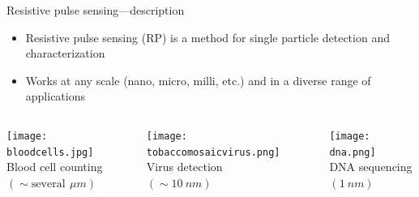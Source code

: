 \begin{frame}[c]{Resistive pulse sensing---description}
	
	
	
			\begin{itemize}
				\item Resistive pulse sensing (RP) is a method for single particle detection and characterization
				\item Works at any scale (nano, micro, milli, etc.) and in a diverse range of applications
			\end{itemize}
	

	\begin{columns}[t]
		\begin{column}[T]{1.67in}
			{\centering
				\texttt{[image: bloodcells.jpg]} \\
				Blood cell counting \\
				$\left(\sim\mathrm{several}\,\SI{}{\mu m}\right)$ \\
				\par
			}
		\end{column}
		
		\begin{column}[T]{1.67in}
			{\centering
				\texttt{[image: tobaccomosaicvirus.png]} \\
				Virus detection \\
				$\left(\sim\SI{10}{nm}\right)$ \\
				\par
			}
		\end{column}
		
		\begin{column}[T]{1.67in}
			{\centering
				\texttt{[image: dna.png]} \\
				DNA sequencing \\
				$\left(\SI{1}{nm}\right)$ \\
				\par
			}
		\end{column}

	\end{columns}

	
\end{frame}





